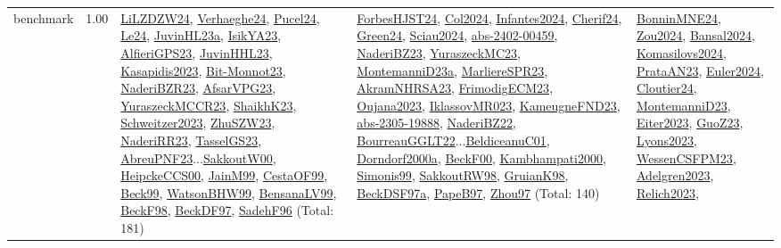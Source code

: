 {\begin{longtable}{p{3cm}r>{\raggedright\arraybackslash}p{6cm}>{\raggedright\arraybackslash}p{6cm}>{\raggedright\arraybackslash}p{8cm}}
\index{benchmark}\index{Benchmarks!benchmark}benchmark &  1.00 & \hyperref[detail:LiLZDZW24]{LiLZDZW24}, \hyperref[detail:Verhaeghe24]{Verhaeghe24}, \hyperref[detail:Pucel24]{Pucel24}, \hyperref[detail:Le24]{Le24}, \hyperref[detail:JuvinHL23a]{JuvinHL23a}, \hyperref[detail:IsikYA23]{IsikYA23}, \hyperref[detail:AlfieriGPS23]{AlfieriGPS23}, \hyperref[detail:JuvinHHL23]{JuvinHHL23}, \hyperref[detail:Kasapidis2023]{Kasapidis2023}, \hyperref[detail:Bit-Monnot23]{Bit-Monnot23}, \hyperref[detail:NaderiBZR23]{NaderiBZR23}, \hyperref[detail:AfsarVPG23]{AfsarVPG23}, \hyperref[detail:YuraszeckMCCR23]{YuraszeckMCCR23}, \hyperref[detail:ShaikhK23]{ShaikhK23}, \hyperref[detail:Schweitzer2023]{Schweitzer2023}, \hyperref[detail:ZhuSZW23]{ZhuSZW23}, \hyperref[detail:NaderiRR23]{NaderiRR23}, \hyperref[detail:TasselGS23]{TasselGS23}, \hyperref[detail:AbreuPNF23]{AbreuPNF23}...\hyperref[detail:SakkoutW00]{SakkoutW00}, \hyperref[detail:HeipckeCCS00]{HeipckeCCS00}, \hyperref[detail:JainM99]{JainM99}, \hyperref[detail:CestaOF99]{CestaOF99}, \hyperref[detail:Beck99]{Beck99}, \hyperref[detail:WatsonBHW99]{WatsonBHW99}, \hyperref[detail:BensanaLV99]{BensanaLV99}, \hyperref[detail:BeckF98]{BeckF98}, \hyperref[detail:BeckDF97]{BeckDF97}, \hyperref[detail:SadehF96]{SadehF96} (Total: 181) & \hyperref[detail:ForbesHJST24]{ForbesHJST24}, \hyperref[detail:Col2024]{Col2024}, \hyperref[detail:Infantes2024]{Infantes2024}, \hyperref[detail:Cherif24]{Cherif24}, \hyperref[detail:Green24]{Green24}, \hyperref[detail:Sciau2024]{Sciau2024}, \hyperref[detail:abs-2402-00459]{abs-2402-00459}, \hyperref[detail:NaderiBZ23]{NaderiBZ23}, \hyperref[detail:YuraszeckMC23]{YuraszeckMC23}, \hyperref[detail:MontemanniD23a]{MontemanniD23a}, \hyperref[detail:MarliereSPR23]{MarliereSPR23}, \hyperref[detail:AkramNHRSA23]{AkramNHRSA23}, \hyperref[detail:FrimodigECM23]{FrimodigECM23}, \hyperref[detail:Oujana2023]{Oujana2023}, \hyperref[detail:IklassovMR023]{IklassovMR023}, \hyperref[detail:KameugneFND23]{KameugneFND23}, \hyperref[detail:abs-2305-19888]{abs-2305-19888}, \hyperref[detail:NaderiBZ22]{NaderiBZ22}, \hyperref[detail:BourreauGGLT22]{BourreauGGLT22}...\hyperref[detail:BeldiceanuC01]{BeldiceanuC01}, \hyperref[detail:Dorndorf2000a]{Dorndorf2000a}, \hyperref[detail:BeckF00]{BeckF00}, \hyperref[detail:Kambhampati2000]{Kambhampati2000}, \hyperref[detail:Simonis99]{Simonis99}, \hyperref[detail:SakkoutRW98]{SakkoutRW98}, \hyperref[detail:GruianK98]{GruianK98}, \hyperref[detail:BeckDSF97a]{BeckDSF97a}, \hyperref[detail:PapeB97]{PapeB97}, \hyperref[detail:Zhou97]{Zhou97} (Total: 140) & \hyperref[detail:BonninMNE24]{BonninMNE24}, \hyperref[detail:Zou2024]{Zou2024}, \hyperref[detail:Bansal2024]{Bansal2024}, \hyperref[detail:Komasilovs2024]{Komasilovs2024}, \hyperref[detail:PrataAN23]{PrataAN23}, \hyperref[detail:Euler2024]{Euler2024}, \hyperref[detail:Cloutier24]{Cloutier24}, \hyperref[detail:MontemanniD23]{MontemanniD23}, \hyperref[detail:Eiter2023]{Eiter2023}, \hyperref[detail:GuoZ23]{GuoZ23}, \hyperref[detail:Lyons2023]{Lyons2023}, \hyperref[detail:WessenCSFPM23]{WessenCSFPM23}, \hyperref[detail:Adelgren2023]{Adelgren2023}, \hyperref[detail:Relich2023]{Relich2023}, 
\end{longtable}}
